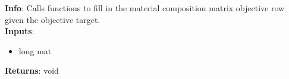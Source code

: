\textbf{Info}: Calls functions to fill in the material composition matrix
objective row given the objective target. \\

\noindent \textbf{Inputs}:
\begin{itemize}
\item{long mat}
\end{itemize}

\noindent \textbf{Returns}: void
